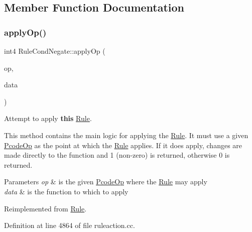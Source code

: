 \subsection{Member Function Documentation}
\mbox{\label{class_rule_cond_negate_a085f7cbc001d8d211be810d8578f4b7a}} 
\subsubsection{\texorpdfstring{applyOp()}{applyOp()}}
{\footnotesize\ttfamily int4 Rule\+Cond\+Negate\+::apply\+Op (\begin{DoxyParamCaption}\item[{\mbox{\hyperlink{class_pcode_op}{Pcode\+Op}} $\ast$}]{op,  }\item[{\mbox{\hyperlink{class_funcdata}{Funcdata}} \&}]{data }\end{DoxyParamCaption})\hspace{0.3cm}{\ttfamily [virtual]}}



Attempt to apply {\bfseries{this}} \mbox{\hyperlink{class_rule}{Rule}}. 

This method contains the main logic for applying the \mbox{\hyperlink{class_rule}{Rule}}. It must use a given \mbox{\hyperlink{class_pcode_op}{Pcode\+Op}} as the point at which the \mbox{\hyperlink{class_rule}{Rule}} applies. If it does apply, changes are made directly to the function and 1 (non-\/zero) is returned, otherwise 0 is returned. 
\begin{DoxyParams}{Parameters}
{\em op} & is the given \mbox{\hyperlink{class_pcode_op}{Pcode\+Op}} where the \mbox{\hyperlink{class_rule}{Rule}} may apply \\
\hline
{\em data} & is the function to which to apply \\
\hline
\end{DoxyParams}


Reimplemented from \mbox{\hyperlink{class_rule_a4e3e61f066670175009f60fb9dc60848}{Rule}}.



Definition at line 4864 of file ruleaction.\+cc.

